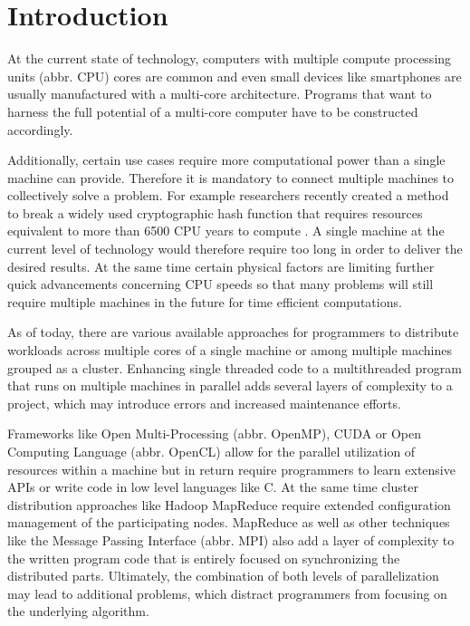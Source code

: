 \chapter{Introduction}
\label{intro}
At the current state of technology, computers with multiple compute processing units (abbr. CPU) cores are common and even small devices like smartphones are usually manufactured with a multi-core architecture. Programs that want to harness the full potential of a multi-core computer have to be constructed accordingly.

Additionally, certain use cases require more computational power than a single machine can provide. Therefore it is mandatory to connect multiple machines to collectively solve a problem. For example researchers recently created a method to break a widely used cryptographic hash function that requires resources equivalent to more than 6500 CPU years to compute \cite{shattered}. A single machine at the current level of technology would therefore require too long in order to deliver the desired results. At the same time certain physical factors are limiting further quick advancements concerning CPU speeds \cite{end_of_moores_law}\cite{end_of_silicon} so that many problems will still require multiple machines in the future for time efficient computations.

As of today, there are various available approaches for programmers to distribute workloads across multiple cores of a single machine or among multiple machines grouped as a cluster. Enhancing single threaded code to a multithreaded program that runs on multiple machines in parallel adds several layers of complexity to a project, which may introduce errors and increased maintenance efforts.

Frameworks like Open Multi-Processing (abbr. OpenMP), CUDA or Open Computing Language (abbr. OpenCL) allow for the parallel utilization of resources within a machine but in return require programmers to learn extensive APIs or write code in low level languages like C.
At the same time cluster distribution approaches like Hadoop MapReduce require extended configuration management of the participating nodes. MapReduce as well as other techniques like the Message Passing Interface (abbr. MPI) also add a layer of complexity to the written program code that is entirely focused on synchronizing the distributed parts.
Ultimately, the combination of both levels of parallelization may lead to additional problems, which distract programmers from focusing on the underlying algorithm.

